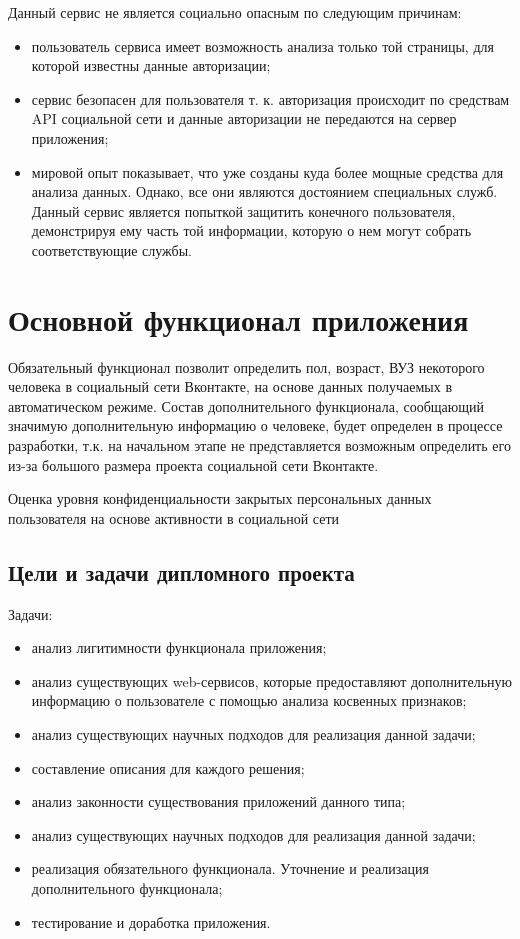 Данный сервис не является социально опасным по следующим причинам:
\begin{itemize}
\item пользователь сервиса имеет возможность анализа только той страницы, для которой известны данные авторизации;
\item сервис безопасен для пользователя т. к. авторизация происходит по средствам  API  социальной сети и данные авторизации не передаются на сервер приложения; 
\item мировой опыт показывает, что уже созданы куда более мощные средства для анализа данных. Однако, все они являются достоянием специальных служб. Данный сервис является попыткой защитить конечного пользователя, демонстрируя ему часть той информации, которую о нем могут собрать соответствующие службы.
\end{itemize}

\section{Основной функционал приложения}
Обязательный функционал позволит определить пол, возраст, ВУЗ некоторого человека в социальный сети Вконтакте, на основе данных получаемых в автоматическом режиме. Состав дополнительного функционала, сообщающий значимую дополнительную информацию о человеке,  будет определен в процессе разработки, т.к. на начальном этапе не представляется возможным определить его из-за большого размера проекта социальной сети Вконтакте.

Оценка уровня конфиденциальности закрытых персональных данных пользователя на основе активности в социальной сети

\subsection{Цели и задачи дипломного проекта}
Задачи:
	\begin{itemize}
\item анализ лигитимности функционала приложения;
\item анализ существующих web-сервисов, которые предоставляют дополнительную информацию о пользователе с помощью анализа косвенных признаков;
\item анализ существующих научных подходов для реализация данной задачи;
\item составление описания для каждого решения;
\item анализ законности существования приложений данного типа;
\item анализ существующих научных подходов для реализация данной задачи;
\item реализация обязательного функционала. Уточнение и реализация дополнительного функционала;
\item тестирование и доработка приложения.
	\end{itemize}
	
